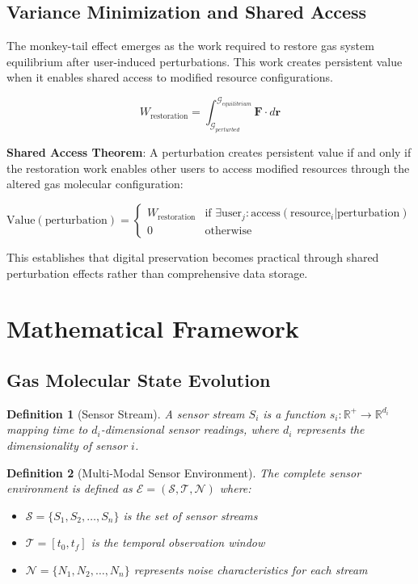 \documentclass[12pt,a4paper]{article}
\newtheorem{definition}{Definition}
\begin{document}
\subsection{Variance Minimization and Shared Access}

The monkey-tail effect emerges as the work required to restore gas system equilibrium after user-induced perturbations. This work creates persistent value when it enables shared access to modified resource configurations.

\begin{equation}
W_{\text{restoration}} = \int_{\mathcal{G}_{perturbed}}^{\mathcal{G}_{equilibrium}} \mathbf{F} \cdot d\mathbf{r}
\end{equation}

\textbf{Shared Access Theorem}: A perturbation creates persistent value if and only if the restoration work enables other users to access modified resources through the altered gas molecular configuration:

\begin{equation}
\text{Value}(\text{perturbation}) = \begin{cases} 
W_{\text{restoration}} & \text{if } \exists \text{user}_j : \text{access}(\text{resource}_i | \text{perturbation}) \\
0 & \text{otherwise}
\end{cases}
\end{equation}

This establishes that digital preservation becomes practical through shared perturbation effects rather than comprehensive data storage.

\section{Mathematical Framework}

\subsection{Gas Molecular State Evolution}

\begin{definition}[Sensor Stream]
A sensor stream $S_i$ is a function $s_i: \mathbb{R}^+ \rightarrow \mathbb{R}^{d_i}$ mapping time to $d_i$-dimensional sensor readings, where $d_i$ represents the dimensionality of sensor $i$.
\end{definition}

\begin{definition}[Multi-Modal Sensor Environment]
The complete sensor environment is defined as $\mathcal{E} = (\mathcal{S}, \mathcal{T}, \mathcal{N})$ where:
\begin{itemize}
\item $\mathcal{S} = \{S_1, S_2, \ldots, S_n\}$ is the set of sensor streams
\item $\mathcal{T} = [t_0, t_f]$ is the temporal observation window
\item $\mathcal{N} = \{N_1, N_2, \ldots, N_n\}$ represents noise characteristics for each stream
\end{itemize}
\end{definition}
\end{document}

